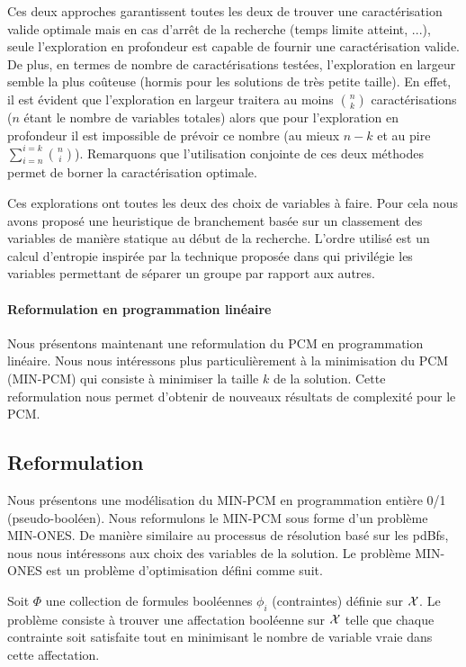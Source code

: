 Ces deux approches garantissent toutes les deux de trouver une caractérisation valide optimale mais en cas d'arrêt de la recherche (temps limite atteint, ...), seule l'exploration en profondeur est capable de fournir une caractérisation valide. De plus, en termes de nombre de caractérisations testées, l'exploration en largeur semble la plus coûteuse (hormis pour les solutions de très petite taille). En effet, il est évident que l'exploration en largeur traitera au moins $\binom{n}{k}$ caractérisations ($n$ étant le nombre de variables totales) alors que pour l'exploration en profondeur il est impossible de prévoir ce nombre (au mieux $n-k$ et au pire $\sum_{i=n}^{i=k}\binom{n}{i}$). Remarquons que l'utilisation conjointe de ces deux méthodes permet de borner la caractérisation optimale.

Ces explorations ont toutes les deux des choix de variables à faire. Pour cela nous avons proposé une heuristique de branchement basée sur un classement des variables de manière statique au début de la recherche. L'ordre utilisé est un calcul d'entropie inspirée par la technique proposée dans \cite{DesVer81} qui privilégie les variables permettant de séparer un groupe par rapport aux autres.

\paragraph{Reformulation en programmation linéaire}

Nous présentons maintenant une reformulation du PCM en programmation linéaire. Nous nous intéressons plus
particulièrement à la minimisation du PCM (MIN-PCM) qui consiste à minimiser la taille  $k$ de la solution. Cette reformulation nous permet d'obtenir de nouveaux résultats de complexité pour le PCM.

\subsection{Reformulation}
Nous présentons une modélisation du
MIN-PCM en programmation entière 0/1 (pseudo-booléen). Nous reformulons le MIN-PCM sous forme d'un problème MIN-ONES. De manière similaire au processus de résolution basé sur les pdBfs, nous nous intéressons aux choix des variables de la solution. Le problème MIN-ONES est un problème d'optimisation défini comme suit.

\begin{definition}
Soit $ \Phi $ une collection de formules booléennes $\phi_i$ (contraintes)
définie sur  $\cal X$. Le problème consiste à trouver une affectation booléenne  sur $\cal X$ telle que
chaque contrainte soit satisfaite tout en minimisant le nombre de variable vraie dans cette affectation.
\end{definition}

